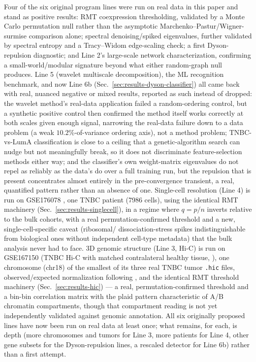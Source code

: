 \documentclass[11pt]{article}
\begin{document}
Four of the six original program lines were run on real data in this
paper and stand as positive results: RMT coexpression thresholding,
validated by a Monte Carlo permutation null rather than the asymptotic
Marchenko--Pastur/Wigner-surmise comparison alone; spectral
denoising/spiked eigenvalues, further validated by spectral entropy and
a Tracy--Widom edge-scaling check; a first Dyson-repulsion diagnostic;
and Line 2's large-scale network characterization, confirming a
small-world/modular signature beyond what either random-graph null
produces.
Line 5 (wavelet multiscale decomposition), the ML recognition
benchmark, and now Line 6b (Sec.~\ref{sec:results-dyson-classifier})
all came back with real, nuanced negative or mixed results, reported as
such instead of dropped: the wavelet method's real-data application
failed a random-ordering control, but a synthetic positive control then
confirmed the method itself works correctly at both scales given
enough signal, narrowing the real-data failure down to a data problem
(a weak $10.2\%$-of-variance ordering axis), not a method problem;
TNBC-vs-LumA classification is close to a ceiling that a
genetic-algorithm search can nudge but not meaningfully break, so it
does not discriminate feature-selection methods either way; and the
classifier's own weight-matrix eigenvalues do not repel as reliably as
the data's do over a full training run, but the repulsion that is
present concentrates almost entirely in the pre-convergence transient,
a real, quantified pattern rather than an absence of one. Single-cell
resolution (Line 4) is run on GSE176078 \citep{tnbcsc2021}, one TNBC
patient (7986 cells), using the identical RMT machinery
(Sec.~\ref{sec:results-singlecell}), in a regime where $q=p/n$ inverts
relative to the bulk cohorts, with a real permutation-confirmed
threshold and a new, single-cell-specific caveat (ribosomal/
dissociation-stress spikes indistinguishable from biological ones
without independent cell-type metadata) that the bulk analysis never
had to face. 3D genomic structure (Line 3, Hi-C) is run on GSE167150
(TNBC Hi-C with matched contralateral healthy tissue,
\citealp{reyesgopar2025}), one chromosome (chr18) of the smallest of
its three real TNBC tumor \texttt{.hic} files, observed/expected
normalization following \citet{liebermanaiden2009}, and the identical
RMT threshold machinery (Sec.~\ref{sec:results-hic}) --- a real,
permutation-confirmed threshold and a bin-bin
correlation matrix with the plaid pattern characteristic of A/B
chromatin compartments, though that compartment reading is not yet
independently validated against genomic annotation. All six originally
proposed lines have now been run on real data at least once; what
remains, for each, is depth (more chromosomes and tumors for Line 3,
more patients for Line 4, other gene subsets for the Dyson-repulsion
lines, a rescaled detector for Line 6b) rather than a first attempt.
\end{document}
